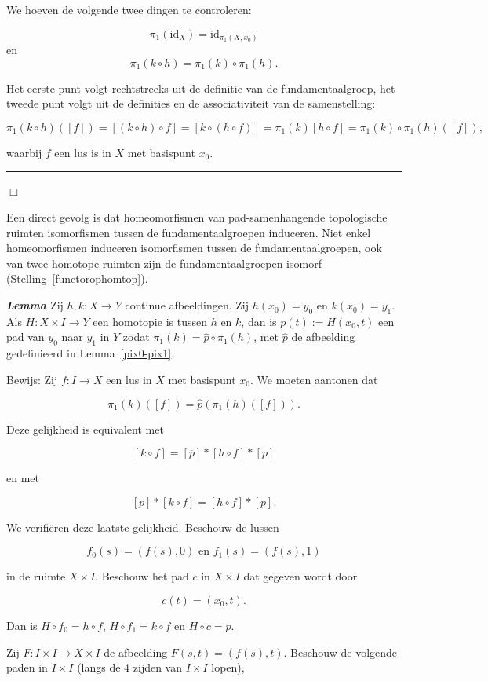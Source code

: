 \documentclass[12pt]{book}
\newcommand{\bew}{{\sc Bewijs: }}
\newcommand{\B}{\rule{1mm}{0mm} \hfill $\Box$ }
\newcommand{\id}{\mbox{id}}
\newenvironment{lem}{\begin{lemh}{\em {\bf Lemma }}}{\end{lemh}}
\begin{document}
We hoeven de volgende twee dingen te controleren:

$$
\pi_1(\id_X) = \id_{\pi_1(X,x_0)}
$$
en
$$\pi_1(k \circ h)= \pi_1(k) \circ \pi_1(h).$$

Het eerste punt volgt rechtstreeks uit de definitie van de fundamentaalgroep, het tweede punt volgt uit de definities en de associativiteit van de samenstelling: 

$$\pi_1(k\circ h)([f])=
[(k\circ h) \circ f]=[k\circ (h\circ f)]=\pi_1(k)[h\circ f] =\pi_1(k) \circ \pi_1(h) ([f]),$$

waarbij $f$ een lus is in $X$ met basispunt $x_0$.
\B

Een direct gevolg is dat homeomorfismen van pad-samenhangende topologische ruimten isomorfismen tussen de fundamentaalgroepen induceren. Niet enkel homeomorfismen induceren isomorfismen tussen de fundamentaalgroepen, ook van twee homotope ruimten zijn de fundamentaalgroepen isomorf (Stelling~\ref{functorophomtop}). 

\begin{lem} \label{functorophomtop1} 
Zij $h,k:X\to Y$ continue afbeeldingen. Zij $h(x_0)=y_0$ en $k(x_0)=y_1$. 
Als $H:X\times I\to Y$ een homotopie is tussen $h$ en $k$,
dan is $p(t):=H(x_0,t)$ een pad van $y_0$ naar $y_1$ in $Y$ zodat $\pi_1(k)=\hat{p}\circ \pi_1(h)$, met $\hat{p}$ de afbeelding gedefinieerd in Lemma~\ref{pix0-pix1}.
\end{lem}

\bew Zij $f:I\to X$ een lus in $X$ met basispunt $x_0$. We moeten aantonen dat

$$\pi_1(k)([f])=\hat{p}(\pi_1(h)([f])).$$

Deze gelijkheid is equivalent met

$$[k\circ f]=[\overline{p}]*[h\circ f]*[p]$$

en met

$$[p]*[k\circ f]=[h\circ f]*[p].$$

We verifi\"eren deze laatste gelijkheid.
Beschouw de lussen 

$$f_0(s)=(f(s),0) \mbox{ en } f_1(s)=(f(s),1)$$

in de ruimte $X\times I$.
 Beschouw het pad $c$ in $X\times I$ dat gegeven wordt door 

$$c(t)=(x_0,t).$$

Dan is $H\circ f_0=h\circ f$, $H\circ f_1=k \circ f$ en $H\circ c = p$. 

Zij $F:I\times I \to X\times I$ de afbeelding $F(s,t)=(f(s), t)$. Beschouw de volgende paden
in $I\times I$ (langs de 4 zijden van $I\times I$ lopen),
\end{document}

